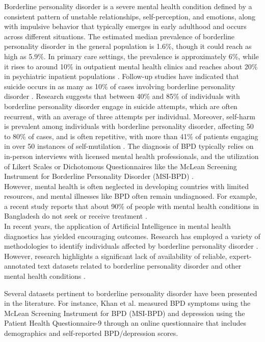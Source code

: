 \documentclass{article}
\providecommand{\citealp}[1]{\cite{#1}}
\begin{document}
Borderline personality disorder is a severe mental health condition defined by a consistent pattern of unstable relationships, self-perception, and emotions, along with impulsive behavior that typically emerges in early adulthood and occurs across different situations.
The estimated median prevalence of borderline personality disorder in the general population is 1.6\%, though it could reach as high as 5.9\%. In primary care settings, the prevalence is approximately 6\%, while it rises to around 10\% in outpatient mental health clinics and reaches about 20\% in psychiatric inpatient populations \cite{dsm}.
Follow-up studies have indicated that suicide occurs in as many as 10\% of cases involving borderline personality disorder \citealp{paris2001,stone1990}. Research suggests that between 40\% and 85\% of individuals with borderline personality disorder engage in suicide attempts, which are often recurrent, with an average of three attempts per individual. Moreover, self-harm is prevalent among individuals with borderline personality disorder, affecting 50 to 80\% of cases, and is often repetitive, with more than 41\% of patients engaging in over 50 instances of self-mutilation \cite{oumaya2008}.
The diagnosis of BPD typically relies on in-person interviews with licensed mental health professionals, and the utilization of Likert Scales or Dichotomous Questionnaires like the McLean Screening Instrument for Borderline Personality Disorder (MSI-BPD) \cite{zanarini2003}. \\

However, mental health is often neglected in developing countries with limited resources, and mental illnesses like BPD often remain undiagnosed. For example, a recent study reports that about 90\% of people with mental health conditions in Bangladesh do not seek or receive treatment \cite{huque2025}.\\

In recent years, the application of Artificial Intelligence in mental health diagnostics \cite{sr2024, lawrence2024, perlis2024} has yielded encouraging outcomes. Research has employed a variety of methodologies to identify individuals affected by borderline personality disorder \cite{lahnakoski2024, arango2024, nazari2024}.
However, research highlights a significant lack of availability of reliable, expert-annotated text datasets related to borderline personality disorder and other mental health conditions \cite{mocnik2024, zhang2022}.

Several datasets pertinent to borderline personality disorder have been presented in the literature. For instance, Khan et al. \cite{khan2023} measured BPD symptoms using the McLean Screening Instrument for BPD (MSI-BPD) and depression using the Patient Health Questionnaire-9 \cite{kroenke1999} through an online questionnaire that includes demographics and self-reported BPD/depression scores.
\end{document}
